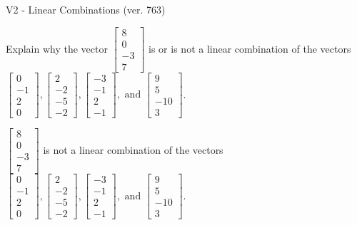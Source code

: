 \begin{exercise}
  \begin{exerciseTitle}V2 - Linear Combinations (ver. 763)\end{exerciseTitle}
  \begin{exerciseStatement}
    Explain why the vector \(\left[\begin{array}{c}
8 \\
0 \\
-3 \\
7
\end{array}\right]\)  is or is not a linear 
	combination of the vectors \(\left[\begin{array}{c}
0 \\
-1 \\
2 \\
0
\end{array}\right] , \left[\begin{array}{c}
2 \\
-2 \\
-5 \\
-2
\end{array}\right] , \left[\begin{array}{c}
-3 \\
-1 \\
2 \\
-1
\end{array}\right] , \text{ and } \left[\begin{array}{c}
9 \\
5 \\
-10 \\
3
\end{array}\right]\).
	


  \end{exerciseStatement}
  \begin{exerciseAnswer}
   \(\left[\begin{array}{c}
8 \\
0 \\
-3 \\
7
\end{array}\right]\) 
  	 is not  
	a linear combination of the vectors \(\left[\begin{array}{c}
0 \\
-1 \\
2 \\
0
\end{array}\right] , \left[\begin{array}{c}
2 \\
-2 \\
-5 \\
-2
\end{array}\right] , \left[\begin{array}{c}
-3 \\
-1 \\
2 \\
-1
\end{array}\right] , \text{ and } \left[\begin{array}{c}
9 \\
5 \\
-10 \\
3
\end{array}\right]\).


\end{exerciseAnswer}
\end{exercise}

